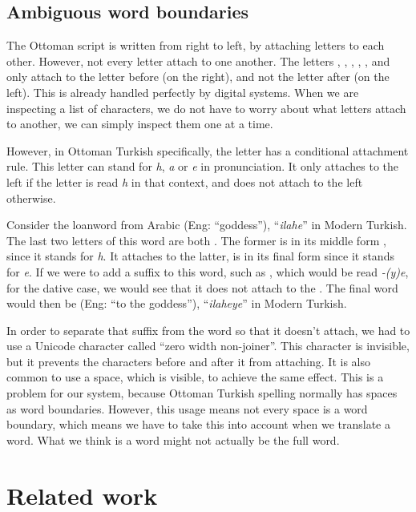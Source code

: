 \documentclass[10pt,twocolumn]{article}
\theoremstyle{nonumberplain}
\newcommand{\otto}[1]{\RLE{\ottoman{}\Large{}#1}}
\newcommand{\word}[1]{``\emph{#1}''}
\begin{document}
\subsection{Ambiguous word boundaries}

The Ottoman script is written from right to left, by attaching letters to each other.
However, not every letter attach to one another.
The letters \otto{ا}, \otto{د}, \otto{ذ}, \otto{ر}, \otto{ز}, \otto{ژ} and \otto{و}
only attach to the letter before (on the right), and not the letter after (on the left).
This is already handled perfectly by digital systems. When we are inspecting a
list of characters, we do not have to worry about what letters attach to
another, we can simply inspect them one at a time.

However, in Ottoman Turkish specifically, the letter \otto{ہ} has a conditional
attachment rule. This letter can stand for \emph{h}, \emph{a} or \emph{e} in
pronunciation. It only attaches to the left if the letter \otto{ہ} is read
\emph{h} in that context, and does not attach to the left otherwise.

Consider the loanword from Arabic \otto{الهه} (Eng: ``goddess''), \word{ilahe} in Modern Turkish.
The last two letters of this word are both \otto{ہ}. The former is in its
middle form \otto{ـهـ}, since it stands for \emph{h}. It attaches to the
latter, is in its final form \otto{ـه} since it stands for \emph{e}.
If we were to add a suffix to this word, such as \otto{يه}, which would be read \emph{-(y)e}, for the dative case, we would see that it does not attach to the \otto{ہ}. The final word would then be \otto{الهه‌يه} (Eng:  ``to the goddess''), \word{ilaheye} in Modern Turkish.

In order to separate that suffix from the word so that it doesn't attach, we
had to use a Unicode character called ``zero width non-joiner''. This character
is invisible, but it prevents the characters before and after it from
attaching.
It is also common to use a space, which is visible, to achieve the same effect.
This is a problem for our system, because Ottoman Turkish spelling normally has
spaces as word boundaries.  However, this usage means not every space is a
word boundary, which means we have to take this into account when we translate
a word. What we think is a word might not actually be the full word.

\section{Related work}
\end{document}
